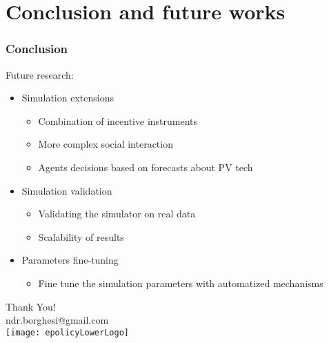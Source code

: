 \documentclass{beamer}
\begin{document}
\section{Conclusion and future works}
	
	\begin{frame}
	\frametitle{Conclusion}
	Future research:
	\begin{itemize}
		\item Simulation extensions
		\begin{itemize}
			\item Combination of incentive instruments
			\item More complex social interaction
			\item Agents decisions based on forecasts about PV tech
		\end{itemize}
		\item Simulation validation
		\begin{itemize}
			\item Validating the simulator on real data
			\item Scalability of results
		\end{itemize}
		\item Parameters fine-tuning
		\begin{itemize}
			\item Fine tune the simulation parameters with automatized mechanisms
		\end{itemize}
	\end{itemize}
	\end{frame}
	
	\begin{frame}
      \begin{center}
        Thank You!\\
        ndr.borghesi@gmail.com\\
        \bigskip \bigskip \bigskip \bigskip 
        \texttt{[image: epolicyLowerLogo]}
      \end{center}
       
    \end{frame}
\end{document}
